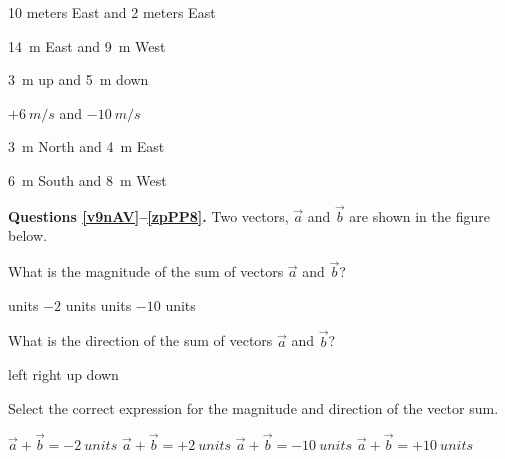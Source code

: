 \documentclass[]{exam}
\begin{document}
\begin{questions}
\question \label{tex2J}
10 meters East and 2 meters East

\question
\SI{14}{m} East and \SI{9}{m} West

\question
\SI{3}{m} up and \SI{5}{m} down

\question 
$+\SI{6}{m/s}$ and $-\SI{10}{m/s}$

\question
\SI{3}{m} North and \SI{4}{m} East

\question \label{nOEef}
\SI{6}{m} South and \SI{8}{m} West



\begin{EnvUplevel}
\textbf{Questions \ref{v9nAV}--\ref{zpPP8}.} Two vectors, $\vec{a}$ and $\vec{b}$ are shown in the figure below.

\begin{center}
\end{center}
\end{EnvUplevel}


\question \label{v9nAV}
What is the magnitude of the sum of vectors $\vec{a}$ and $\vec{b}$?

\begin{randomizechoices}
     units
    \choice $-2$ units
     units
    \choice $-10$ units
\end{randomizechoices}

\question 
What is the direction of the sum of vectors $\vec{a}$ and $\vec{b}$?

\begin{randomizechoices}
    \correctchoice left
    \choice right
    \choice up
    \choice down
\end{randomizechoices}

\question \label{zpPP8}
Select the correct expression for the magnitude and direction of the vector sum.

\begin{randomizechoices}
    \correctchoice $\vec{a} + \vec{b} = \SI{-2}{units}$
    \choice $\vec{a} + \vec{b} = +\SI{2}{units}$
    \choice $\vec{a} + \vec{b} = \SI{-10}{units}$
    \choice $\vec{a} + \vec{b} = +\SI{10}{units}$
\end{randomizechoices}


\end{questions}
\end{document}
